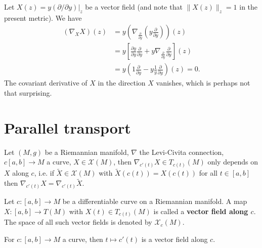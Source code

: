\documentclass[letter-paper]{tufte-book}
\newenvironment{example}[1][Example]{\begin{trivlist}
\item[\hskip \labelsep {\bfseries #1}]}{\end{trivlist}}
\begin{document}
\begin{example}
  Let $X(z) = y(\partial / \partial y)|_z$ be a vector field (and note that $\|X(z)\|_z = 1$ in the present metric). We have
  \begin{align*}
    (\nabla_X X)(z) 
      &= y\left( \nabla_{\frac{\partial}{\partial y}} \left( y\frac{\partial}{\partial y} \right) \right)(z)\\
      &= y\left[\frac{\partial y}{\partial y}\frac{\partial}{\partial y} + y \nabla_{\frac{\partial}{\partial y}} \frac{\partial}{\partial y} \right](z)\\
      &= y\left( 1\frac{\partial}{\partial y} - y \frac{1}{y}\frac{\partial}{\partial y}\right)(z) = 0.
  \end{align*}
  The covariant derivative of $X$ in the direction $X$ vanishes, which is perhaps not that surprising.
\end{example}


\section{Parallel transport}

Let $(M,g)$ be a Riemannian manifold, $\nabla$ the Levi-Civita connection, $c[a,b] \to M$ a curve, $X \in \mathcal{X}(M)$, then $\nabla_{c'(t)} X \in T_{c(t)}(M)$ only depends on $X$ along $c$, i.e. if $\tilde{X} \in \mathcal{X}(M)$ with $\tilde{X}(c(t)) = X(c(t))$ for all $t \in [a,b]$ then $\nabla_{c'(t)}X = \nabla_{c'(t)} \tilde{X}$.

Let $c:[a,b] \to M$ be a differentiable curve on a Riemannian manifold. A map $X:[a,b] \to T(M)$ with $X(t) \in T_{c(t)}(M)$ is called a \textbf{vector field along $c$}. The space of all such vector fields is denoted by $\mathcal{X}_c(M)$.

\begin{example}
  For $c:[a,b] \to M$ a curve, then $t\mapsto c'(t)$ is a vector field along $c$.
\end{example}
\end{document}
